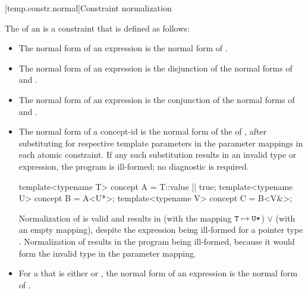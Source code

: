 [temp.constr.normal]{Constraint normalization}
%

\pnum
The  of an   is
a constraint that is defined as follows:
%
\begin{itemize}
\item
The normal form of an expression  is
the normal form of .

\item
The normal form of an expression  is
the disjunction of
the normal forms of  and .

\item
The normal form of an expression 
is the conjunction of
the normal forms of  and .

\item
The normal form of a concept-id 
is the normal form of the  of ,
after substituting  for
 respective template parameters in the
parameter mappings in each atomic constraint.
If any such substitution results in an invalid type or expression,
the program is ill-formed; no diagnostic is required.
\begin{example}
\begin{codeblock}
template<typename T> concept A = T::value || true;
template<typename U> concept B = A<U*>;
template<typename V> concept C = B<V&>;
\end{codeblock}
Normalization of  
is valid and results in
 (with the mapping $\texttt{\protect T} \mapsto \texttt{\protect U*}$)
$\lor$
 (with an empty mapping),
despite the expression  being ill-formed
for a pointer type .
Normalization of  
results in the program being ill-formed,
because it would form the invalid type 
in the parameter mapping.
\end{example}

\item
For a 
that is either \tcode{\&\&} or \tcode{||},
the normal form of an expression
 is the normal form of
.


\end{itemize}
